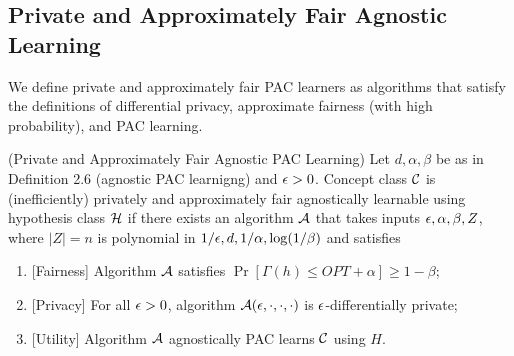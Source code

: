 \subsection{Private and Approximately Fair Agnostic Learning}
We define private and approximately fair PAC learners as algorithms that satisfy the definitions of differential privacy, approximate fairness (with high probability), and PAC learning.
\begin{defn}
	(Private and Approximately Fair Agnostic PAC Learning)
	Let $d, \alpha, \beta$ be as in Definition 2.6 (agnostic PAC
  learnigng) and $\epsilon > 0$. Concept class $\mathcal{C}$ is (inefficiently)
  privately and approximately fair agnostically learnable using
  hypothesis class $\mathcal{H}$ if there exists an algorithm $\mathcal{A}$ that takes
  inputs $\epsilon, \alpha, \beta, Z$, where $|Z|=n$ is polynomial in
  $1/\epsilon, d, 1/\alpha, \log(1/\beta)$ and satisfies
	\begin{enumerate}
		\item {[}Fairness{]} Algorithm $\mathcal{A}$ satisfies $\Pr[\Gamma(h) \leq
    OPT + \alpha] \geq 1-\beta$;
		\item {[}Privacy{]} For all $\epsilon>0$, algorithm $\mathcal{A}(\epsilon, \cdot, \cdot, \cdot)$ is $\epsilon$-differentially private;
		\item {[}Utility{]} Algorithm $\mathcal{A}$ agnostically PAC learns $\mathcal{C}$ using $H$.
	\end{enumerate}
\end{defn}
